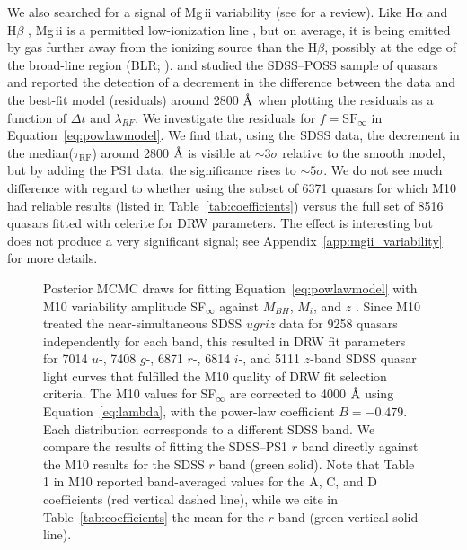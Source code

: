 \documentclass[twocolumn]{aastex62}
\let\oldAA\AA
\renewcommand{\AA}{\text{\normalfont\oldAA}}
\newcommand{\project}[1]{\textsf{#1}}
\begin{document}
We also searched for a signal of Mg\,{\sc ii} variability (see \citealt{cackett2015} for a review). Like H$\alpha$  and  H$\beta$ , Mg\,{\sc ii} is a permitted low-ionization line \citep{yang2020}, but on average, it is being emitted by gas further away from the ionizing source than the  H$\beta$, possibly at the edge of the broad-line region (BLR; \citealt{guo2020}). \cite{ivezic2004} and \cite{macleod2012} studied the SDSS--POSS sample of quasars and reported the detection of a decrement in the difference between the data and the best-fit model  (residuals) around 2800 $\mbox{\AA}$ when plotting the residuals as a function of $\Delta t$ and $\lambda_{RF}$. We investigate the residuals for $f=\mathrm{SF}_{\infty}$ in Equation~\ref{eq:powlawmodel}. We find that, using the SDSS data, the decrement in the median($\tau_{\mathrm{RF}}$) around 2800 $\mbox{\AA}$ is visible at ${\sim}3 \sigma$  relative to the smooth model, but by adding the PS1 data, the significance rises to ${\sim}5 \sigma$. We do not see much difference with regard to whether using the subset of 6371 quasars for which M10 had reliable results (listed in Table~\ref{tab:coefficients}) versus  the full set of 8516 quasars fitted with \project{celerite} for DRW parameters. The effect is interesting but does not produce a very significant signal; see Appendix~\ref{app:mgii_variability} for more details. 

\begin{figure*}  
	\caption{Posterior MCMC draws for fitting Equation~\ref{eq:powlawmodel} with M10 variability amplitude SF$_{\infty}$ against $M_{BH}$, $M_{i}$, and $z$ \citep{shen2011}. Since M10 treated the near-simultaneous SDSS $ugriz$ data for 9258 quasars independently for each band, this resulted in  DRW fit parameters for 7014 $u$-,  7408 $g$-,  6871 $r$-, 6814 $i$-, and 5111 $z$-band SDSS quasar light curves that fulfilled the M10 quality of DRW fit selection criteria. The M10 values for SF$_{\infty}$ are corrected to 4000 $\mbox{\AA}$ using Equation~\ref{eq:lambda}, with the power-law coefficient $B=-0.479$. Each distribution corresponds to a different SDSS band. We compare the results of fitting the SDSS--PS1 $r$ band directly against the M10 results for the SDSS $r$ band (green solid). Note that Table 1 in M10 reported band-averaged values for the A, C, and D coefficients (red vertical dashed  line), while we cite in Table~\ref{tab:coefficients} the mean for the $r$ band (green vertical solid line).}
	\label{fig:ugriz_drw_M10}
\end{figure*} 
\end{document}

